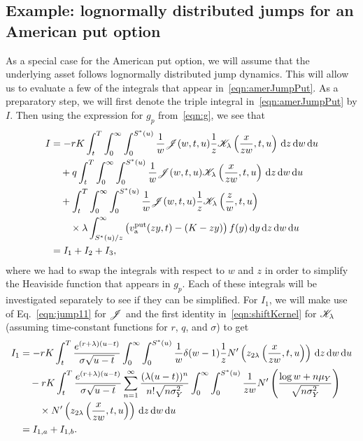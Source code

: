         	\subsection{Example: lognormally distributed jumps for an American put option}
        	As a special case for the American put option, we will assume that the underlying asset follows lognormally distributed jump dynamics. This will allow us to evaluate a few of the integrals that appear in~\eqref{eqn:amerJumpPut}. As a preparatory step, we will first denote the triple integral in~\eqref{eqn:amerJumpPut} by $I$. Then using the expression for $g_p$ from~\eqref{eqn:g}, we see that
        	\begin{align*}
        		I &= -rK \int_t^T\int_0^\infty\int_0^{S^*(u)}\frac{1}{w}\mathscr J(w,t,u)\frac{1}{z}\mathscr K_\lambda\left( \frac{x}{zw},t,u \right) \, \mathrm d z \, \mathrm d w \, \mathrm d u \\
        		& {} \quad + q \int_t^T\int_0^\infty\int_0^{S^*(u)}\frac{1}{w}\mathscr J(w,t,u)\mathscr K_\lambda\left( \frac{x}{zw},t,u \right) \, \mathrm d z \, \mathrm d w \, \mathrm d u \\
        		& {} \quad + \int_t^T\int_0^\infty\int_0^{S^*(u)} \frac{1}{w}\mathscr J(w,t,u)\frac{1}{z}\mathscr K_\lambda\left( \frac{z}{w},t,u \right) \\
        		&{} \quad \quad \times  \lambda \int_{S^*(u)/z}^\infty \left( v_{\text{a}}^{\text{put}}(zy,t) - (K-zy) \right)f(y) \, \mathrm d y \, \mathrm d z \, \mathrm d w \, \mathrm d u \\
        		& = I_1 + I_2 + I_3,
        	\end{align*}
        	where we had to swap the integrals with respect to $w$ and $z$ in order to simplify the Heaviside function that appears in $g_p$. Each of these integrals will be investigated separately to see if they can be simplified. For $I_1$, we will make use of Eq.~\eqref{eqn:jump11} for $\mathscr J$ and the first identity in~\eqref{eqn:shiftKernel} for $\mathscr K_\lambda$ (assuming time-constant functions for $r$, $q$, and $\sigma$) to get
        		\begin{align*}
        			I_1 &= -rK\int_t^T \frac{e^{(r+\lambda)(u-t)}}{\sigma\sqrt{u-t}} \int_0^\infty\int_0^{S^*(u)} \frac{1}{w} \delta(w-1) \frac{1}{z} N'\left( z_{2\lambda}\left( \frac{x}{zw}, t, u \right) \right) \, \mathrm d z \, \mathrm d w \, \mathrm d u \\
        			& {}\quad -rK\int_t^T \frac{e^{(r+\lambda)(u-t)}}{\sigma\sqrt{u-t}} \displaystyle\sum\limits_{n=1}^{\infty} \frac{(\lambda(u-t))^n}{n!\sqrt{n\sigma_Y^2}}\int_0^\infty \int_0^{S^*(u)} \frac{1}{zw}N'\left( \frac{\log w + n\mu_Y}{\sqrt{n\sigma_Y^2}} \right) \\
        			& {} \quad \quad \times N'\left( z_{2\lambda}\left( \frac{x}{zw}, t, u \right) \right) \, \mathrm d z \, \mathrm d w \, \mathrm d u \\
        			&= I_{1,a} + I_{1,b}.
        		\end{align*}
